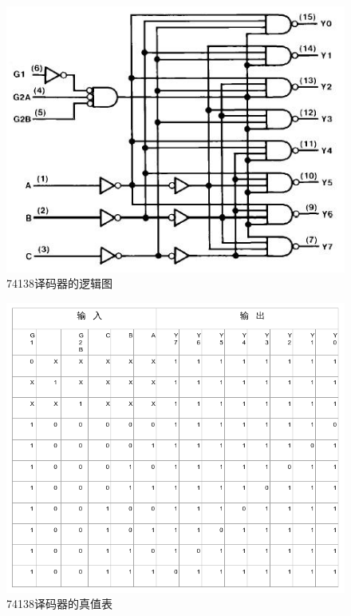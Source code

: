 \documentclass{article}
\begin{document}
\begin{CJK*}{UTF8}{gbsn}
\begin{center}
\begin{figure}[h!]
\includegraphics[width=\textwidth]{1.jpg}
\caption{74138译码器的逻辑图}
\label{fig: afig}
\end{figure}
\end{center}

\begin{center}
\begin{figure}[h!]
\includegraphics[width=\textwidth]{2.jpg}
\caption{74138译码器的真值表}
\label{fig: bfig}
\end{figure}
\end{center}


\end{CJK*}
\end{document}
